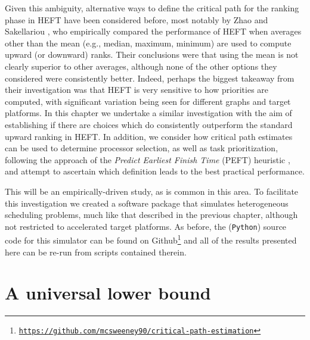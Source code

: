 \documentclass[12pt]{article}
\begin{document}
Given this ambiguity, alternative ways to define the critical path for the ranking phase in HEFT have been considered before, most notably by Zhao and Sakellariou \cite{zhao03}, who empirically compared the performance of HEFT when averages other than the mean (e.g., median, maximum, minimum) are used to compute upward (or downward) ranks. Their conclusions were that using the mean is not clearly superior to other averages, although none of the other options they considered were consistently better. Indeed, perhaps the biggest takeaway from their investigation was that HEFT is very sensitive to how priorities are computed, with significant variation being seen for different graphs and target platforms. In this chapter we undertake a similar investigation with the aim of establishing if there are choices which do consistently outperform the standard upward ranking in HEFT. In addition, we consider how critical path estimates can be used to determine processor selection, as well as task prioritization, following the approach of the {\em Predict Earliest Finish Time} (PEFT) heuristic \cite{arabnejad14}, and attempt to ascertain which definition leads to the best practical performance.        

This will be an empirically-driven study, as is common in this area. To facilitate this investigation we created a software package that simulates heterogeneous scheduling problems, much like that described in the previous chapter, although not restricted to accelerated target platforms. As before, the ({\tt Python}) source code for this simulator can be found on Github\footnote{\href{https://github.com/mcsweeney90/critical-path-estimation}{{\tt \small https://github.com/mcsweeney90/critical-path-estimation}}} and all of the results presented here can be re-run from scripts contained therein. 


\section{A universal lower bound}
\label{sect.optimistic}
\end{document}
